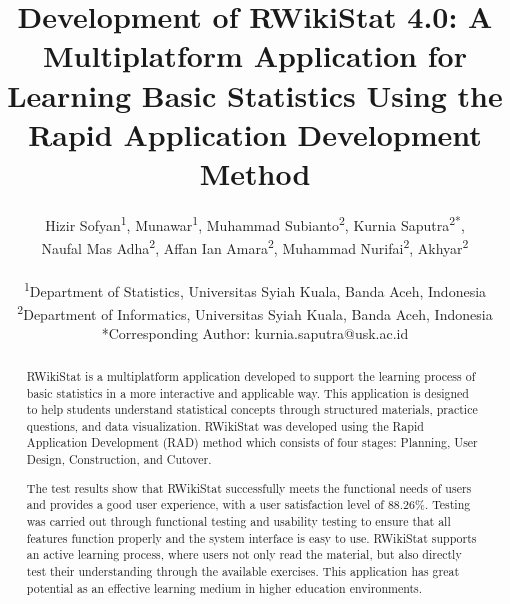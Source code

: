 \documentclass[conference,a4paper]{IEEEtran}
\begin{document}
\title{
  Development of RWikiStat 4.0: A Multiplatform Application for Learning Basic Statistics Using the Rapid Application Development Method \\
}

\makeatletter
\newcommand{\linebreakand}{
  \end{@IEEEauthorhalign}
  \hfill\mbox{}\par
  \mbox{}\hfill\begin{@IEEEauthorhalign}
}
\makeatother

\author{
  Hizir Sofyan\textsuperscript{1}, Munawar\textsuperscript{1}, Muhammad Subianto\textsuperscript{2}, Kurnia Saputra\textsuperscript{2*},\\
  Naufal Mas Adha\textsuperscript{2}, Affan Ian Amara\textsuperscript{2}, Muhammad Nurifai\textsuperscript{2}, Akhyar\textsuperscript{2}\\
  \\
  \textsuperscript{1}Department of Statistics, Universitas Syiah Kuala, Banda Aceh, Indonesia\\
  \textsuperscript{2}Department of Informatics, Universitas Syiah Kuala, Banda Aceh, Indonesia\\
  *Corresponding Author: kurnia.saputra@usk.ac.id
}

\maketitle

\begin{abstract}
  RWikiStat is a multiplatform application developed to support the learning process of basic statistics in a more interactive and applicable way. This application is designed to help students understand statistical concepts through structured materials, practice questions, and data visualization. RWikiStat was developed using the Rapid Application Development (RAD) method which consists of four stages: Planning, User Design, Construction, and Cutover.

  The test results show that RWikiStat successfully meets the functional needs of users and provides a good user experience, with a user satisfaction level of 88.26\%. Testing was carried out through functional testing and usability testing to ensure that all features function properly and the system interface is easy to use. RWikiStat supports an active learning process, where users not only read the material, but also directly test their understanding through the available exercises. This application has great potential as an effective learning medium in higher education environments.

\end{abstract}
\end{document}
